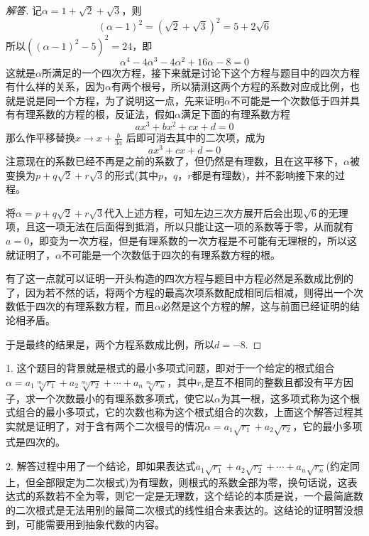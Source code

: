 \begin{proof}[解答]
记$\alpha=1+\sqrt{2}+\sqrt{3}$，则
\[ (\alpha-1)^2=(\sqrt{2}+\sqrt{3})^2=5+2\sqrt{6} \]
所以$((\alpha-1)^2-5)^2=24$，即
\[ \alpha^4-4\alpha^3-4\alpha^2+16\alpha-8=0 \]
这就是$\alpha$所满足的一个四次方程，接下来就是讨论下这个方程与题目中的四次方程有什么样的关系，因为$\alpha$有两个根号，所以猜测这两个方程的系数对应成比例，也就是说是同一个方程，为了说明这一点，先来证明$\alpha$不可能是一个次数低于四并具有有理系数的方程的根，反证法，假如$\alpha$满足下面的有理系数方程
\[ ax^3+bx^2+cx+d=0 \]
那么作平移替换$x \to x+\frac{b}{3a}$ 后即可消去其中的二次项，成为
\[ ax^3+cx+d=0 \]
注意现在的系数已经不再是之前的系数了，但仍然是有理数，且在这平移下，$\alpha$被变换为$p+q\sqrt{2}+r\sqrt{3}$的形式(其中$p$，$q$，$r$都是有理数)，并不影响接下来的过程。

将$\alpha=p+q\sqrt{2}+r\sqrt{3}$代入上述方程，可知左边三次方展开后会出现$\sqrt{6}$的无理项，且这一项无法在后面得到抵消，所以只能让这一项的系数等于零，从而就有$a=0$，即变为一次方程，但是有理系数的一次方程是不可能有无理根的，所以这就证明了，$\alpha$不可能是一个次数低于四次的有理系数方程的根。

有了这一点就可以证明一开头构造的四次方程与题目中方程必然是系数成比例的了，因为若不然的话，将两个方程的最高次项系数配成相同后相减，则得出一个次数低于四次的有理系数方程，而且$\alpha$必然是这个方程的解，这与前面已经证明的结论相矛盾。

于是最终的结果是，两个方程系数成比例，所以$d=-8$.
\end{proof}

\begin{exerciseAdditional}
1. 这个题目的背景就是根式的最小多项式问题，即对于一个给定的根式组合$\alpha=a_1\sqrt[m_1]{r_1}+a_2\sqrt[m_2]{r_2}+\cdots+a_n\sqrt[m_n]{r_n}$，其中$r_i$是互不相同的整数且都没有平方因子，求一个次数最小的有理系数多项式，使它以$\alpha$为其一根，这多项式称为这个根式组合的最小多项式，它的次数也称为这个根式组合的次数，上面这个解答过程其实就是证明了，对于含有两个二次根号的情况$\alpha=a_1\sqrt{r_1}+a_2\sqrt{r_2}$，它的最小多项式是四次的。

2. 解答过程中用了一个结论，即如果表达式$a_1\sqrt{r_1}+a_2\sqrt{r_2}+\cdots+a_n\sqrt{r_n}$(约定同上，但全部限定为二次根式)为有理数，则根式的系数全部为零，换句话说，这表达式的系数若不全为零，则它一定是无理数，这个结论的本质是说，一个最简底数的二次根式是无法用别的最简二次根式的线性组合来表达的。这结论的证明暂没想到，可能需要用到抽象代数的内容。
\end{exerciseAdditional}





